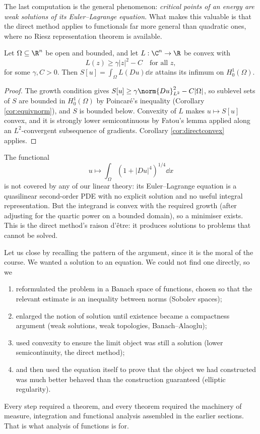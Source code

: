 The last computation is the general phenomenon: \emph{critical points of an energy are weak solutions of its Euler--Lagrange equation}. What makes this valuable is that the direct method applies to functionals far more general than quadratic ones, where no Riesz representation theorem is available.

\begin{theorem}\label{thm:convexintegrand}
	Let $\Omega\subseteq\R^n$ be open and bounded, and let $L : \C^n\to\R$ be convex with
	$$L(z)\ge\gamma|z|^2-C \quad \text{for all }z,$$
	for some $\gamma, C>0$. Then $S[u]=\int_\Omega L(Du)\dd x$ attains its infimum on $H_0^1(\Omega)$.
\end{theorem}

\begin{proof}
	The growth condition gives $S[u]\ge\gamma\norm{Du}^2_{L^2}-C|\Omega|$, so sublevel sets of $S$ are bounded in $H_0^1(\Omega)$ by Poincar\'e's inequality (Corollary \ref{cor:equivnorm}), and $S$ is bounded below. Convexity of $L$ makes $u \mapsto S[u]$ convex, and it is strongly lower semicontinuous by Fatou's lemma applied along an $L^2$-convergent subsequence of gradients. Corollary \ref{cor:directconvex} applies.
\end{proof}

\begin{example}
	The functional
	$$u \mapsto \int_\Omega\left(1+|Du|^4\right)^{1/4}\dd x$$
	is not covered by any of our linear theory: its Euler--Lagrange equation is a quasilinear second-order PDE with no explicit solution and no useful integral representation. But the integrand is convex with the required growth (after adjusting for the quartic power on a bounded domain), so a minimiser exists. This is the direct method's raison d'\^etre: it produces solutions to problems that cannot be solved.
\end{example}

\begin{remark}
	Let us close by recalling the pattern of the argument, since it is the moral of the course. We wanted a solution to an equation. We could not find one directly, so we
	\begin{enumerate}[label=(\roman*)]
		\item reformulated the problem in a Banach space of functions, chosen so that the relevant estimate is an inequality between norms (Sobolev spaces);
		\item enlarged the notion of solution until existence became a compactness argument (weak solutions, weak topologies, Banach--Alaoglu);
		\item used convexity to ensure the limit object was still a solution (lower semicontinuity, the direct method);
		\item and then used the equation itself to prove that the object we had constructed was much better behaved than the construction guaranteed (elliptic regularity).
	\end{enumerate}
	Every step required a theorem, and every theorem required the machinery of measure, integration and functional analysis assembled in the earlier sections. That is what analysis of functions is for.
\end{remark}

